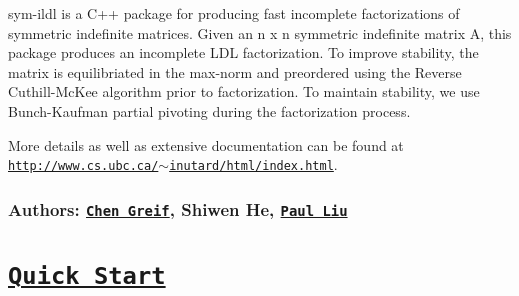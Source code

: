 sym-\/ildl is a C++ package for producing fast incomplete factorizations of symmetric indefinite matrices. Given an n x n symmetric indefinite matrix A, this package produces an incomplete L\+DL\textquotesingle{} factorization. To improve stability, the matrix is equilibriated in the max-\/norm and preordered using the Reverse Cuthill-\/\+Mc\+Kee algorithm prior to factorization. To maintain stability, we use Bunch-\/\+Kaufman partial pivoting during the factorization process.

More details as well as extensive documentation can be found at \href{http://www.cs.ubc.ca/~inutard/html/index.html}{\tt http\+://www.\+cs.\+ubc.\+ca/$\sim$inutard/html/index.\+html}.

\subsubsection*{Authors\+: \href{http://www.cs.ubc.ca/~greif/}{\tt Chen Greif}, Shiwen He, \href{http://www.cs.ubc.ca/~inutard/}{\tt Paul Liu}}

\section*{\href{http://www.cs.ubc.ca/~inutard/html/index.html}{\tt Quick Start} }
